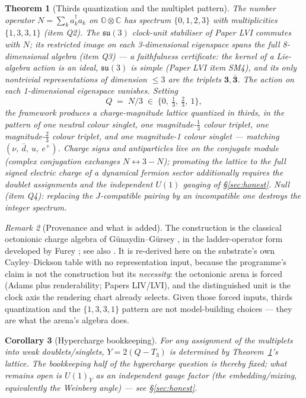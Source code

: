 \documentclass[12pt]{article}
\newtheorem{theorem}{Theorem}
\newtheorem{corollary}[theorem]{Corollary}
\theoremstyle{definition}
\theoremstyle{remark}
\newtheorem{remark}[theorem]{Remark}
\newcommand{\Oc}{\mathbb{O}}
\begin{document}
\begin{theorem}[Thirds quantization and the multiplet pattern]\label{thm:thirds}
The number operator $N = \sum_k a_k^\dagger a_k$ on $\Oc \otimes \mathbb C$ has spectrum $\{0, 1, 2, 3\}$ with multiplicities $\{1, 3, 3, 1\}$ (item Q2). The $\mathfrak{su}(3)$ clock-unit stabiliser of Paper LVI commutes with $N$; its restricted image on each 3-dimensional eigenspace spans the full 8-dimensional algebra (item Q3) --- a faithfulness certificate: the kernel of a Lie-algebra action is an ideal, $\mathfrak{su}(3)$ is simple (Paper LVI item SM4), and its only nontrivial representations of dimension $\le 3$ are the triplets $\mathbf 3, \bar{\mathbf 3}$. The action on each 1-dimensional eigenspace vanishes. Setting
$$Q \;=\; N/3 \;\in\; \{0,\ \tfrac13,\ \tfrac23,\ 1\},$$
the framework produces a charge-\emph{magnitude} lattice quantized in thirds, in the pattern of one neutral colour singlet, one magnitude-$\tfrac13$ colour triplet, one magnitude-$\tfrac23$ colour triplet, and one magnitude-1 colour singlet --- matching $(\nu,\ \bar d,\ u,\ e^+)$. Charge \emph{signs} and antiparticles live on the conjugate module (complex conjugation exchanges $N \leftrightarrow 3 - N$); promoting the lattice to the full signed electric charge of a dynamical fermion sector additionally requires the doublet assignments and the independent $U(1)$ gauging of \S\ref{sec:honest}. Null (item Q4): replacing the $J$-compatible pairing by an incompatible one destroys the integer spectrum.
\end{theorem}

\begin{remark}[Provenance and what is added]
The construction is the classical octonionic charge algebra of G\"unaydin--G\"ursey \citep{GunaydinGursey1973}, in the ladder-operator form developed by Furey \citep{Furey2016}; see also \citet{Baez2002}. It is re-derived here on the substrate's own Cayley--Dickson table with no representation input, because the programme's claim is not the construction but its \emph{necessity}: the octonionic arena is forced (Adams plus renderability; Papers LIV/LVI), and the distinguished unit is the clock axis the rendering chart already selects. Given those forced inputs, thirds quantization and the $\{1,3,3,1\}$ pattern are not model-building choices --- they are what the arena's algebra does.
\end{remark}

\begin{corollary}[Hypercharge bookkeeping]\label{cor:hyper}
For any assignment of the multiplets into weak doublets/singlets, $Y = 2(Q - T_3)$ is determined by Theorem~\ref{thm:thirds}'s lattice. The bookkeeping half of the hypercharge question is thereby fixed; what remains open is $U(1)_Y$ as an \emph{independent gauge factor} (the embedding/mixing, equivalently the Weinberg angle) --- see \S\ref{sec:honest}.
\end{corollary}
\end{document}
